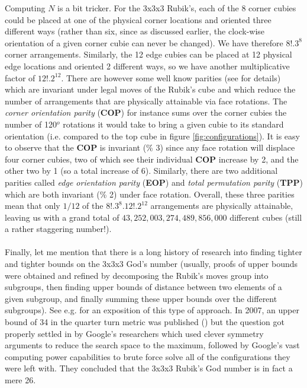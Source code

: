 Computing $N$ is a bit tricker. For the 3x3x3 Rubik's, each of the 8 corner cubies could be placed at one of the physical corner locations and oriented three different ways (rather than six, since as discussed earlier, the clock-wise orientation of a given corner cubie can never be changed). We have therefore $8! . 3^{8}$ corner arrangements. Similarly, the 12 edge cubies can be placed at 12 physical edge locations and oriented 2 different ways, so we have another multiplicative factor of $12! . 2^{12}$. There are however some well know parities (see \cite{Schoenert} for details) which are invariant under legal moves of the Rubik's cube and which reduce the number of arrangements that are physically attainable via face rotations. The \textit{corner orientation parity} (\textbf{COP}) for instance sums over the corner cubies the number of 120$^{o}$ rotations it would take to bring a given cubie to its standard orientation (i.e. compared to the top cube in figure \ref{fig:configurations}). It is easy to observe that the \textbf{COP} is invariant (\% 3) since any face rotation will displace four corner cubies, two of which see their individual \textbf{COP} increase by 2, and the other two by 1 (so a total increase of 6). Similarly, there are two additional parities called \textit{edge orientation parity} (\textbf{EOP}) and \textit{total permutation parity} (\textbf{TPP}) which are both invariant (\% 2) under face rotation. Overall, these three parities mean that only $1/12$ of the $8! . 3^{8} . 12! . 2^{12}$ arrangements are physically attainable, leaving us with a grand total of $43,252,003,274,489,856,000$ different cubes (still a rather staggering number!).
\\
\\
Finally, let me mention that there is a long history of research into finding tighter and tighter bounds on the 3x3x3 God's number (usually, proofs of upper bounds were obtained and refined by decomposing the Rubik's moves group into subgroups, then finding upper bounds of distance between two elements of a given subgroup, and finally summing these upper bounds over the different subgroups). See e.g. \cite{RubiksChicago} for an exposition of this type of approach. In 2007, an upper bound of 34 in the quarter turn metric was published (\cite{RubiksRadu}) but the question got properly settled in \cite{RubiksGodNumber} by Google's researchers which used clever symmetry arguments to reduce the search space to the maximum, followed by Google's vast computing power capabilities to brute force solve all of the configurations they were left with. They concluded that the 3x3x3 Rubik's God number is in fact a mere 26.


